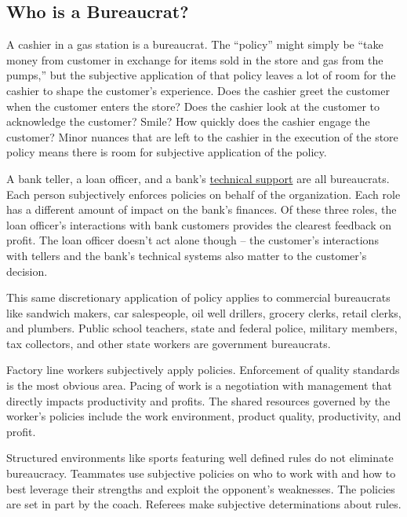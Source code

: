 \subsection*{Who is a Bureaucrat?}

A cashier in a gas station is a bureaucrat. The ``policy'' might simply be ``take money from customer in exchange for items sold in the store and gas from the pumps,'' but the subjective application of that policy leaves a lot of room for the cashier to shape the customer's experience. Does the cashier greet the customer when the customer enters the store? Does the cashier look at the customer to acknowledge the customer? Smile? How quickly does the cashier engage the customer? Minor nuances that are left to the cashier in the execution of the store policy means there is room for subjective application of the policy. 

A bank teller, a loan officer, and a bank's \href{https://en.wikipedia.org/wiki/Technical_support}{technical support} are all bureaucrats. Each person subjectively enforces policies on behalf of the organization. Each role has a different amount of impact on the bank's finances. Of these three roles, the loan officer's interactions with bank customers provides the clearest feedback on profit. The loan officer doesn't act alone though -- the customer's interactions with tellers and the bank's technical systems also matter to the customer's decision. 


This same discretionary application of policy applies to commercial bureaucrats like sandwich makers, car salespeople, oil well drillers, grocery clerks, retail clerks, and plumbers. Public school teachers, state and federal police, military members, tax collectors, and other state workers are government bureaucrats. 


Factory line workers subjectively apply policies. Enforcement of quality standards is the most obvious area. Pacing of work is a negotiation with management that directly impacts productivity and profits. The shared resources governed by the worker's policies include the work environment, product quality, productivity, and profit.

Structured environments like sports featuring well defined rules do not eliminate bureaucracy. Teammates use subjective policies on who to work with and how to best leverage their strengths and exploit the opponent's weaknesses. The policies are set in part by the coach. Referees make subjective determinations about rules.

